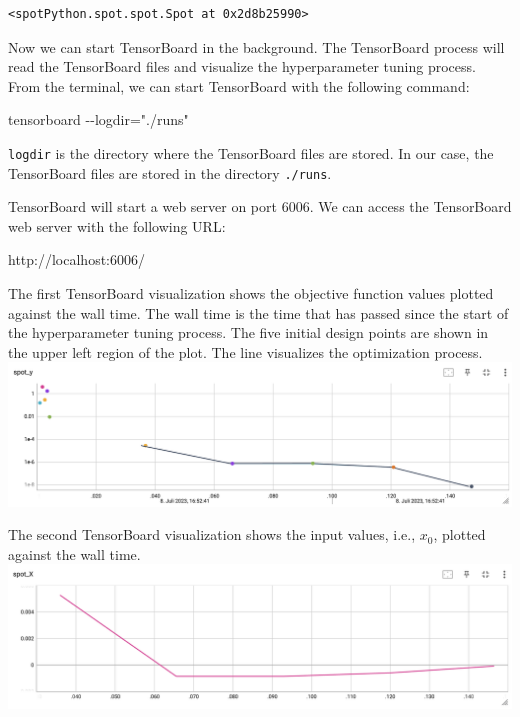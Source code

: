 \documentclass[
  letterpaper,
  DIV=11,
  numbers=noendperiod]{scrreprt}
\newenvironment{Shaded}{\begin{snugshade}}{\end{snugshade}}
\newcommand{\NormalTok}[1]{\textcolor[rgb]{0.00,0.23,0.31}{#1}}
\begin{document}
\begin{verbatim}
<spotPython.spot.spot.Spot at 0x2d8b25990>
\end{verbatim}

Now we can start TensorBoard in the background. The TensorBoard process
will read the TensorBoard files and visualize the hyperparameter tuning
process. From the terminal, we can start TensorBoard with the following
command:

\begin{Shaded}
\begin{Highlighting}[]
\NormalTok{tensorboard {-}{-}logdir="./runs"}
\end{Highlighting}
\end{Shaded}

\texttt{logdir} is the directory where the TensorBoard files are stored.
In our case, the TensorBoard files are stored in the directory
\texttt{./runs}.

TensorBoard will start a web server on port 6006. We can access the
TensorBoard web server with the following URL:

\begin{Shaded}
\begin{Highlighting}[]
\NormalTok{http://localhost:6006/}
\end{Highlighting}
\end{Shaded}

The first TensorBoard visualization shows the objective function values
plotted against the wall time. The wall time is the time that has passed
since the start of the hyperparameter tuning process. The five initial
design points are shown in the upper left region of the plot. The line
visualizes the optimization process.
\includegraphics{figures_static/01_tensorboard_01.png}

The second TensorBoard visualization shows the input values, i.e.,
\(x_0\), plotted against the wall time.
\includegraphics{figures_static/01_tensorboard_02.png}
\end{document}

